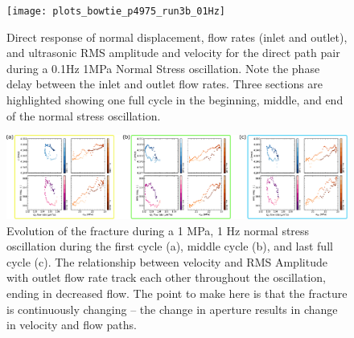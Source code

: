 

\begin{figure}[ht]
	\centering
	\texttt{[image: plots\_bowtie\_p4975\_run3b\_01Hz]}
	\caption[]{Direct response of normal displacement, flow rates (inlet and outlet), and ultrasonic RMS amplitude and velocity for the direct path pair during a 0.1Hz 1MPa Normal Stress oscillation. Note the phase delay between the inlet and outlet flow rates. Three sections are highlighted showing one full cycle in the beginning, middle, and end of the normal stress oscillation. }
	\label{fig:NS_p4975_run3b_01Hz}
\end{figure}


\begin{figure}
	\centering
	\includegraphics[width=0.9\columnwidth]{bowtie_p4975_run3b_01Hz_v3}
	\caption[]{Evolution of the fracture during a 1 MPa, 1 Hz normal stress oscillation during the first cycle (a), middle cycle (b), and last full cycle (c). The relationship between velocity and RMS Amplitude with outlet flow rate track each other throughout the oscillation, ending in decreased flow. The point to make here is that the fracture is continuously changing -- the change in aperture results in change in velocity and flow paths.}
	\label{fig:bowties}
\end{figure}


\newpage



